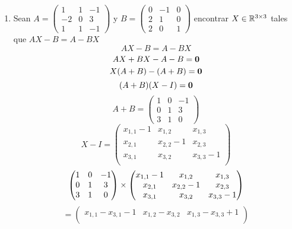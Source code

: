 \documentclass[../practica.root.tex]{subfiles}
\begin{document}
\begin{enumerate}
    \item Sean \(A = \begin{pmatrix}
              1  & 1 & -1 \\
              -2 & 0 & 3  \\
              1  & 1 & -1
          \end{pmatrix}\) y \(B = \begin{pmatrix}
              0 & -1 & 0 \\
              2 & 1  & 0 \\
              2 & 0  & 1
          \end{pmatrix}\) encontrar \(X \in \mathbb{R}^{3\times3}\) tales que \(AX - B = A - BX\)
          \[ AX - B = A - BX \]
          \[ AX + BX - A - B = \mathbf{0} \]
          \[ X(A + B) - (A + B) = \mathbf{0} \]
          \[ (A + B)(X - I) = \mathbf{0} \]
          \[
              A + B = \begin{pmatrix}
                  1 & 0 & -1 \\
                  0 & 1 & 3  \\
                  3 & 1 & 0
              \end{pmatrix}
          \] \[
              X - I = \begin{pmatrix}
                  x_{1,1}-1 & x_{1,2}   & x_{1,3}   \\
                  x_{2,1}   & x_{2,2}-1 & x_{2,3}   \\
                  x_{3,1}   & x_{3,2}   & x_{3,3}-1 \\
              \end{pmatrix}
          \] \[
              \begin{pmatrix}
                  1 & 0 & -1 \\
                  0 & 1 & 3  \\
                  3 & 1 & 0  \\
              \end{pmatrix}
              \times
              \begin{pmatrix}
                  x_{1,1}-1 & x_{1,2}   & x_{1,3}   \\
                  x_{2,1}   & x_{2,2}-1 & x_{2,3}   \\
                  x_{3,1}   & x_{3,2}   & x_{3,3}-1 \\
              \end{pmatrix}
          \] \[
              =
              \begin{pmatrix}
                  x_{1,1} - x_{3,1} - 1    & x_{1,2} - x_{3,2}      & x_{1,3} - x_{3,3} + 1    \\

\end{pmatrix}\]
\end{enumerate}
\end{document}
